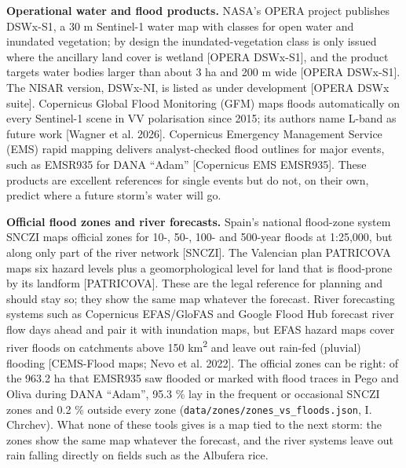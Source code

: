 \documentclass[10pt,twocolumn]{article}
\begin{document}
\textbf{Operational water and flood products.} NASA's OPERA project publishes DSWx-S1, a 30 m Sentinel-1 water map with classes for open water and inundated vegetation; by design the inundated-vegetation class is only issued where the ancillary land cover is wetland [OPERA DSWx-S1], and the product targets water bodies larger than about 3 ha and 200 m wide [OPERA DSWx-S1]. The NISAR version, DSWx-NI, is listed as under development [OPERA DSWx suite]. Copernicus Global Flood Monitoring (GFM) maps floods automatically on every Sentinel-1 scene in VV polarisation since 2015; its authors name L-band as future work [Wagner et al. 2026]. Copernicus Emergency Management Service (EMS) rapid mapping delivers analyst-checked flood outlines for major events, such as EMSR935 for DANA ``Adam'' [Copernicus EMS EMSR935]. These products are excellent references for single events but do not, on their own, predict where a future storm's water will go.

\textbf{Official flood zones and river forecasts.} Spain's national flood-zone system SNCZI maps official zones for 10-, 50-, 100- and 500-year floods at 1:25,000, but along only part of the river network [SNCZI]. The Valencian plan PATRICOVA maps six hazard levels plus a geomorphological level for land that is flood-prone by its landform [PATRICOVA]. These are the legal reference for planning and should stay so; they show the same map whatever the forecast. River forecasting systems such as Copernicus EFAS/GloFAS and Google Flood Hub forecast river flow days ahead and pair it with inundation maps, but EFAS hazard maps cover river floods on catchments above 150 km\textsuperscript{2} and leave out rain-fed (pluvial) flooding [CEMS-Flood maps; Nevo et al. 2022]. The official zones can be right: of the 963.2 ha that EMSR935 saw flooded or marked with flood traces in Pego and Oliva during DANA ``Adam'', 95.3 \% lay in the frequent or occasional SNCZI zones and 0.2 \% outside every zone (\texttt{data/\allowbreak{}zones/\allowbreak{}zones\_\allowbreak{}vs\_\allowbreak{}floods.\allowbreak{}json}, I. Chrchev). What none of these tools gives is a map tied to the next storm: the zones show the same map whatever the forecast, and the river systems leave out rain falling directly on fields such as the Albufera rice.
\end{document}
